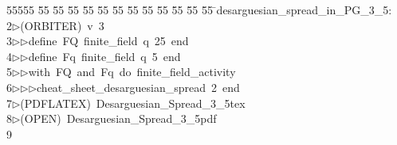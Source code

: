 %
%
\begin{tabbing}
55555 \= 55 \= 55 \= 55 \= 55 \= 55 \= 55 \= 55 \= 55 \= 55 \= 55 \= 55 \= 55 \= \>desarguesian\_spread\_in\_PG\_3\_5:\\[0pt]
2\>$\triangleright$\>(ORBITER)\ v\ 3\ \\[0pt]
3\>$\triangleright$\>$\triangleright$\>define\ FQ\ finite\_field\ q\ 25\ end\ \\[0pt]
4\>$\triangleright$\>$\triangleright$\>define\ Fq\ finite\_field\ q\ 5\ end\ \\[0pt]
5\>$\triangleright$\>$\triangleright$\>with\ FQ\ and\ Fq\ do\ finite\_field\_activity\ \\[0pt]
6\>$\triangleright$\>$\triangleright$\>$\triangleright$\>cheat\_sheet\_desarguesian\_spread\ 2\ end\\[0pt]
7\>$\triangleright$\>(PDFLATEX)\ Desarguesian\_Spread\_3\_5tex\\[0pt]
8\>$\triangleright$\>(OPEN)\ Desarguesian\_Spread\_3\_5pdf\\[0pt]
9\>\end{tabbing}

